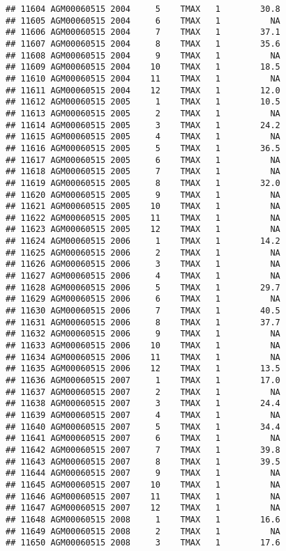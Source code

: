 \documentclass{article}\usepackage[]{graphicx}\usepackage[]{color}
\makeatletter
\newenvironment{kframe}{%
 \def\at@end@of@kframe{}%
 \ifinner\ifhmode%
  \def\at@end@of@kframe{\end{minipage}}%
  \begin{minipage}{\columnwidth}%
 \fi\fi%
 \def\FrameCommand##1{\hskip\@totalleftmargin \hskip-\fboxsep
 \colorbox{shadecolor}{##1}\hskip-\fboxsep
     \hskip-\linewidth \hskip-\@totalleftmargin \hskip\columnwidth}%
 \MakeFramed {\advance\hsize-\width
   \@totalleftmargin\z@ \linewidth\hsize
   \@setminipage}}%
 {\par\unskip\endMakeFramed%
 \at@end@of@kframe}
\newenvironment{knitrout}{}{} %
\makeatother
\begin{document}
\begin{knitrout}
\begin{kframe}
\begin{verbatim}
## 11604 AGM00060515 2004     5    TMAX   1        30.8
## 11605 AGM00060515 2004     6    TMAX   1          NA
## 11606 AGM00060515 2004     7    TMAX   1        37.1
## 11607 AGM00060515 2004     8    TMAX   1        35.6
## 11608 AGM00060515 2004     9    TMAX   1          NA
## 11609 AGM00060515 2004    10    TMAX   1        18.5
## 11610 AGM00060515 2004    11    TMAX   1          NA
## 11611 AGM00060515 2004    12    TMAX   1        12.0
## 11612 AGM00060515 2005     1    TMAX   1        10.5
## 11613 AGM00060515 2005     2    TMAX   1          NA
## 11614 AGM00060515 2005     3    TMAX   1        24.2
## 11615 AGM00060515 2005     4    TMAX   1          NA
## 11616 AGM00060515 2005     5    TMAX   1        36.5
## 11617 AGM00060515 2005     6    TMAX   1          NA
## 11618 AGM00060515 2005     7    TMAX   1          NA
## 11619 AGM00060515 2005     8    TMAX   1        32.0
## 11620 AGM00060515 2005     9    TMAX   1          NA
## 11621 AGM00060515 2005    10    TMAX   1          NA
## 11622 AGM00060515 2005    11    TMAX   1          NA
## 11623 AGM00060515 2005    12    TMAX   1          NA
## 11624 AGM00060515 2006     1    TMAX   1        14.2
## 11625 AGM00060515 2006     2    TMAX   1          NA
## 11626 AGM00060515 2006     3    TMAX   1          NA
## 11627 AGM00060515 2006     4    TMAX   1          NA
## 11628 AGM00060515 2006     5    TMAX   1        29.7
## 11629 AGM00060515 2006     6    TMAX   1          NA
## 11630 AGM00060515 2006     7    TMAX   1        40.5
## 11631 AGM00060515 2006     8    TMAX   1        37.7
## 11632 AGM00060515 2006     9    TMAX   1          NA
## 11633 AGM00060515 2006    10    TMAX   1          NA
## 11634 AGM00060515 2006    11    TMAX   1          NA
## 11635 AGM00060515 2006    12    TMAX   1        13.5
## 11636 AGM00060515 2007     1    TMAX   1        17.0
## 11637 AGM00060515 2007     2    TMAX   1          NA
## 11638 AGM00060515 2007     3    TMAX   1        24.4
## 11639 AGM00060515 2007     4    TMAX   1          NA
## 11640 AGM00060515 2007     5    TMAX   1        34.4
## 11641 AGM00060515 2007     6    TMAX   1          NA
## 11642 AGM00060515 2007     7    TMAX   1        39.8
## 11643 AGM00060515 2007     8    TMAX   1        39.5
## 11644 AGM00060515 2007     9    TMAX   1          NA
## 11645 AGM00060515 2007    10    TMAX   1          NA
## 11646 AGM00060515 2007    11    TMAX   1          NA
## 11647 AGM00060515 2007    12    TMAX   1          NA
## 11648 AGM00060515 2008     1    TMAX   1        16.6
## 11649 AGM00060515 2008     2    TMAX   1          NA
## 11650 AGM00060515 2008     3    TMAX   1        17.6

\end{verbatim}
\end{kframe}
\end{knitrout}
\end{document}
